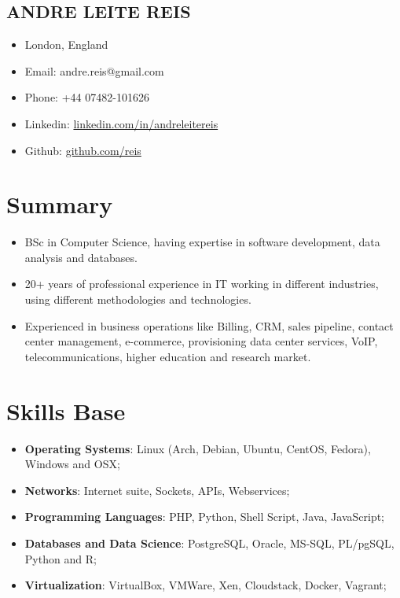 \documentclass[margin,a4paper]{res}
\begin{document}
{\subsection{ANDRE LEITE REIS}\label{andre-leite-reis}

\begin{itemize}
\itemsep1pt\parskip0pt
\item
  London, England
\item
  Email: andre.reis@gmail.com
\item
  Phone: +44 07482-101626
\item
  Linkedin:
  \href{https://linkedin.com/in/andreleitereis}{linkedin.com/in/andreleitereis}
\item
  Github: \href{https://github.com/reis}{github.com/reis}
\end{itemize}

\section{Summary}\label{summary}

\begin{itemize}
\itemsep1pt\parskip0pt
\item
  BSc in Computer Science, having expertise in software development,
  data analysis and databases.
\item
  20+ years of professional experience in IT working in different
  industries, using different methodologies and technologies.
\item
  Experienced in business operations like Billing, CRM, sales pipeline,
  contact center management, e-commerce, provisioning data center
  services, VoIP, telecommunications, higher education and research
  market.
\end{itemize}

\section{Skills Base}\label{skills-base}

\begin{itemize}
\itemsep1pt\parskip0pt
\item
  \textbf{Operating Systems}: Linux (Arch, Debian, Ubuntu, CentOS,
  Fedora), Windows and OSX;
\item
  \textbf{Networks}: Internet suite, Sockets, APIs, Webservices;
\item
  \textbf{Programming Languages}: PHP, Python, Shell Script, Java,
  JavaScript;
\item
  \textbf{Databases and Data Science}: PostgreSQL, Oracle, MS-SQL,
  PL/pgSQL, Python and R;
\item
  \textbf{Virtualization}: VirtualBox, VMWare, Xen, Cloudstack, Docker,
  Vagrant;
\end{itemize}

}
\end{document}
